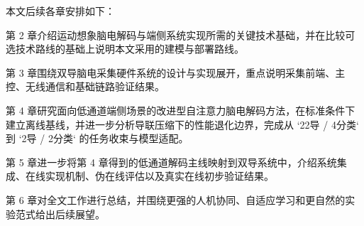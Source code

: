 本文后续各章安排如下：

第 2 章介绍运动想象脑电解码与端侧系统实现所需的关键技术基础，并在比较可选技术路线的基础上说明本文采用的建模与部署路线。

第 3 章围绕双导脑电采集硬件系统的设计与实现展开，重点说明采集前端、主控、无线通信和基础链路验证结果。

第 4 章研究面向低通道端侧场景的改进型自注意力脑电解码方法，在标准条件下建立离线基线，并进一步分析导联压缩下的性能退化边界，完成从 `22导 / 4分类` 到 `2导 / 2分类` 的任务收束与模型适配。

第 5 章进一步将第 4 章得到的低通道解码主线映射到双导系统中，介绍系统集成、在线实现机制、伪在线评估以及真实在线初步验证结果。

第 6 章对全文工作进行总结，并围绕更强的人机协同、自适应学习和更自然的实验范式给出后续展望。
